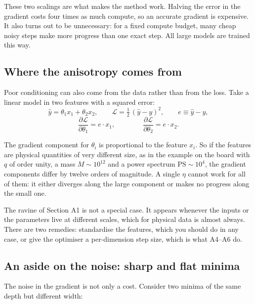 \documentclass[11pt]{article}
\newcommand{\Loss}{\mathcal{L}}
\newcommand{\yhat}{\hat{y}}
\begin{document}
\noindent
These two scalings are what makes the method work. Halving the error in the gradient
costs four times as much compute, so an accurate gradient is expensive. It also turns out
to be unnecessary: for a fixed compute budget, many cheap noisy steps make more progress
than one exact step. All large models are trained this way.

\subsection*{Where the anisotropy comes from}

Poor conditioning can also come from the data rather than from the loss. Take a linear
model in two features with a squared error:
%
\[
  \yhat = \theta_{1} x_{1} + \theta_{2} x_{2},
  \qquad
  \Loss = \tfrac{1}{2}\,(\yhat - y)^{2},
  \qquad
  e \equiv \yhat - y,
\]
\[
  \frac{\partial \Loss}{\partial \theta_{1}} = e \cdot x_{1},
  \qquad\qquad
  \frac{\partial \Loss}{\partial \theta_{2}} = e \cdot x_{2}.
\]

\noindent
The gradient component for $\theta_{i}$ is proportional to the feature $x_{i}$. So if the
features are physical quantities of very different size, as in the example on the board
with $q$ of order unity, a mass $M \sim 10^{12}$ and a power spectrum
$\mathrm{PS} \sim 10^{4}$, the gradient components differ by twelve orders of magnitude. A
single $\eta$ cannot work for all of them: it either diverges along the large component or
makes no progress along the small one.

\begin{keybox}
The ravine of Section A1 is not a special case. It appears whenever the inputs or the
parameters live at different scales, which for physical data is almost always. There are
two remedies: standardise the features, which you should do in any case, or give the
optimiser a per-dimension step size, which is what A4--A6 do.
\end{keybox}

\subsection*{An aside on the noise: sharp and flat minima}

The noise in the gradient is not only a cost. Consider two minima of the same depth but
different width:
\end{document}
